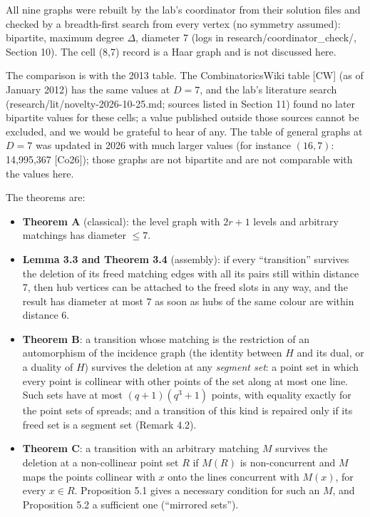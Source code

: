 \documentclass[
  11pt,
]{article}
\providecommand{\tightlist}{%
  \setlength{\itemsep}{0pt}\setlength{\parskip}{0pt}}
\begin{document}
All nine graphs were rebuilt by the lab's coordinator from their solution files and checked by a breadth-first search
from every vertex (no symmetry assumed): bipartite, maximum degree \(\Delta\), diameter 7 (logs in
research/coordinator\_check/, Section 10). The cell (8,7) record is a Haar graph and is not discussed here.

The comparison is with the 2013 table. The CombinatoricsWiki table {[}CW{]} (as of January 2012) has the same values at
\(D = 7\), and the lab's literature search (research/lit/novelty-2026-10-25.md; sources listed in Section 11) found no
later bipartite values for these cells; a value published outside those sources cannot be excluded, and we would be
grateful to hear of any. The table of general graphs at \(D = 7\) was updated in 2026 with much larger values (for
instance \((16,7)\): 14,995,367 {[}Co26{]}); those graphs are not bipartite and are not comparable with the values here.

The theorems are:

\begin{itemize}
\tightlist
\item
  \textbf{Theorem A} (classical): the level graph with \(2r+1\) levels and arbitrary matchings has diameter \(\le 7\).
\item
  \textbf{Lemma 3.3 and Theorem 3.4} (assembly): if every ``transition'' survives the deletion of its freed matching
  edges with all its pairs still within distance 7, then hub vertices can be attached to the freed slots in any way, and
  the result has diameter at most 7 as soon as hubs of the same colour are within distance 6.
\item
  \textbf{Theorem B}: a transition whose matching is the restriction of an automorphism of the incidence graph (the
  identity between \(H\) and its dual, or a duality of \(H\)) survives the deletion at any \emph{segment set}: a point
  set in which every point is collinear with other points of the set along at most one line. Such sets have at most
  \((q+1)(q^3+1)\) points, with equality exactly for the point sets of spreads; and a transition of this kind is
  repaired only if its freed set is a segment set (Remark 4.2).
\item
  \textbf{Theorem C}: a transition with an arbitrary matching \(M\) survives the deletion at a non-collinear point set
  \(R\) if \(M(R)\) is non-concurrent and \(M\) maps the points collinear with \(x\) onto the lines concurrent with
  \(M(x)\), for every \(x\in R\). Proposition 5.1 gives a necessary condition for such an \(M\), and Proposition 5.2 a
  sufficient one (``mirrored sets'').
\end{itemize}
\end{document}
